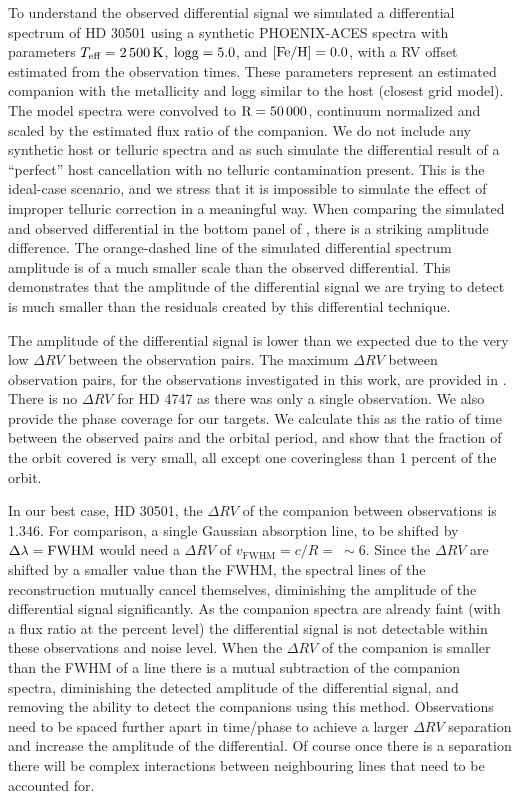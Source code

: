     To understand the observed differential signal we simulated a differential spectrum of {HD 30501} using a synthetic {PHOENIX-ACES} spectra with parameters \(T_{\textrm{eff}} = 2\,500\,\si{\kelvin}{}\), \(\rm logg=5.0\), and \(\rm \feh{}=0.0\), with a {RV} offset estimated from the observation times. These parameters represent an estimated companion \teff{} with the metallicity and logg similar to the host (closest grid model). The model spectra were convolved to \(\rm R=50\,000\), continuum normalized and scaled by the estimated flux ratio of the companion. We do not include any synthetic host or telluric spectra and as such simulate the differential result of a ``perfect'' host cancellation with no telluric contamination present. This is the ideal-case scenario, and we stress that it is impossible to simulate the effect of improper telluric correction in a meaningful way. When comparing the simulated and observed differential in the bottom panel of , there is a striking amplitude difference. The orange-dashed line of the simulated differential spectrum amplitude is of a much smaller scale than the observed differential. This demonstrates that the amplitude of the differential signal we are trying to detect is much smaller than the residuals created by this differential technique.

    The amplitude of the differential signal is lower than we expected due to the very low \(\Delta {RV}\) between the observation pairs. The maximum \(\Delta {RV}\) between observation pairs, for the observations investigated in this work, are provided in . {\red{} There is no \(\Delta {RV}\) for {HD 4747} as there was only a single observation. We also provide the phase coverage for our targets. We calculate this as the ratio of time between the observed pairs and the orbital period, and show that the fraction of the orbit covered is very small, all except one coveringless than 1 percent of the orbit.}

    In our best case, {HD 30501}, the \(\Delta {RV}\) of the companion between observations is 1.346\kmps{}. For comparison, a single Gaussian absorption line, to be shifted by \(\Delta\lambda = \rm {FWHM}\) would need a \(\Delta {RV}\) of \(v_{\textrm{FWHM}} = c/R =~\sim6\)\kmps{}. Since the \(\Delta {RV}\) are shifted by a smaller value than the {FWHM}, the spectral lines of the reconstruction mutually cancel themselves, diminishing the amplitude of the differential signal significantly. As the companion spectra are already faint (with a flux ratio at the percent level) the differential signal is not detectable within these observations and noise level.
    When the \(\Delta {RV}\) of the companion is smaller than the {FWHM} of a line there is a mutual subtraction of the companion spectra, diminishing the detected amplitude of the differential signal, and removing the ability to detect the companions using this method. Observations need to be spaced further apart in time/phase to achieve a larger \(\Delta {RV}\) separation and increase the amplitude of the differential. Of course once there is a separation there will be complex interactions between neighbouring lines that need to be accounted for.


